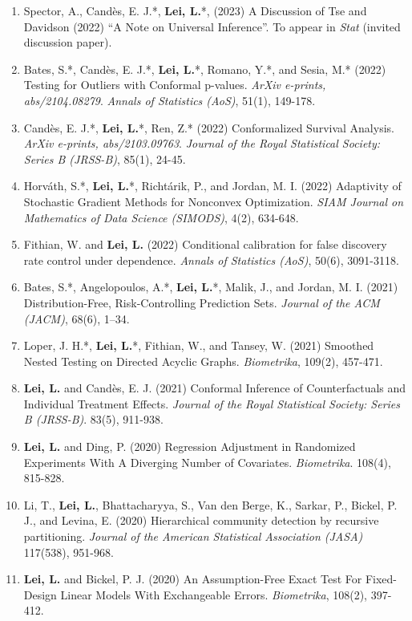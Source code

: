 \documentclass{article}
\begin{document}
\begin{enumerate}
\item Spector, A., Cand\`{e}s, E. J.*, \textbf{Lei, L.}*, (2023) A Discussion of Tse and Davidson (2022) “A Note on Universal Inference”. To appear in \emph{Stat} (invited discussion paper).
\item Bates, S.*, Cand\`{e}s, E. J.*, \textbf{Lei, L.}*, Romano, Y.*, and Sesia, M.* (2022) Testing for Outliers with Conformal p-values. \emph{ArXiv e-prints, abs/2104.08279}. \emph{Annals of Statistics (AoS)}, 51(1), 149-178.  
\item Cand\`{e}s, E. J.*, \textbf{Lei, L.}*, Ren, Z.* (2022) Conformalized Survival Analysis. \emph{ArXiv e-prints, abs/2103.09763}. \emph{Journal of the Royal Statistical Society: Series B (JRSS-B)}, 85(1), 24-45.
\item Horv\'{a}th, S.*, \textbf{Lei, L.}*, Richt\'{a}rik, P., and Jordan, M. I. (2022) Adaptivity of Stochastic Gradient Methods for Nonconvex Optimization. \emph{SIAM Journal on Mathematics of Data Science (SIMODS)}, 4(2), 634-648.
\item Fithian, W. and \textbf{Lei, L.} (2022) Conditional calibration for false discovery rate control under dependence. \emph{Annals of Statistics (AoS)}, 50(6), 3091-3118.
\item Bates, S.*, Angelopoulos, A.*, \textbf{Lei, L.}*, Malik, J., and Jordan, M. I. (2021) Distribution-Free, Risk-Controlling Prediction Sets. \emph{Journal of the ACM (JACM)}, 68(6), 1–34.
\item Loper, J. H.*, \textbf{Lei, L.}*, Fithian, W., and Tansey, W. (2021) Smoothed Nested Testing on Directed Acyclic Graphs. \emph{Biometrika}, 109(2), 457-471.
\item \textbf{Lei, L.} and Cand\`{e}s, E. J. (2021) Conformal Inference of Counterfactuals and Individual Treatment Effects. \emph{Journal of the Royal Statistical Society: Series B (JRSS-B)}. 83(5), 911-938.
\item \textbf{Lei, L.} and Ding, P. (2020) Regression Adjustment in Randomized Experiments With A Diverging Number of Covariates. \emph{Biometrika}. 108(4), 815-828.
\item Li, T., \textbf{Lei, L.}, Bhattacharyya, S., Van den Berge, K., Sarkar, P., Bickel, P. J., and Levina, E. (2020) Hierarchical community detection by recursive partitioning. \emph{Journal of the American Statistical Association (JASA)} 117(538), 951-968.
\item \textbf{Lei, L.} and Bickel, P. J. (2020) An Assumption-Free Exact Test For Fixed-Design Linear Models With Exchangeable Errors. \emph{Biometrika}, 108(2), 397-412.

\end{enumerate}
\end{document}
